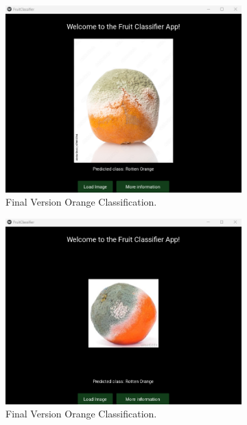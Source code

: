 \documentclass[conference]{IEEEtran}
\begin{document}
\begin{figure}[h]
\begin{subfigure}[b]{0.48\linewidth}
        \includegraphics[width=\linewidth]{Mlayer orageR1.png}
        \caption{Final Version Orange Classification.}
        \label{figFA}
    \end{subfigure}
    \hfill
    \begin{subfigure}[b]{0.48\linewidth}
        \centering
        \includegraphics[width=\linewidth]{Mlayer orageR2.png}
        \caption{Final Version Orange Classification.}
        \label{figFB}
    \end{subfigure}
    \hfill
    \begin{subfigure}[b]{0.48\linewidth}
        \centering

\end{subfigure}
\end{figure}
\end{document}
